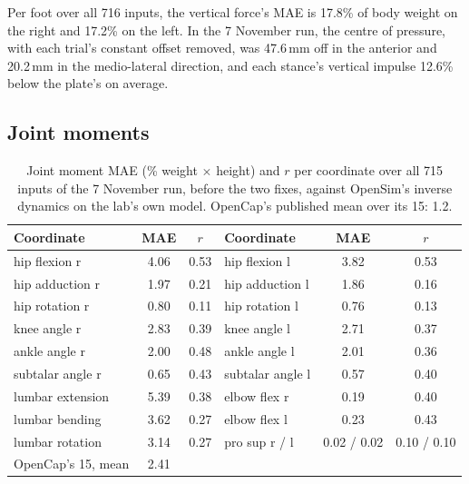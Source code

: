\documentclass[11pt]{article}
\begin{document}
Per foot over all 716 inputs, the vertical force's MAE is 17.8\% of body weight on the right and 17.2\% on the left.
In the 7 November run, the centre of pressure, with each trial's constant offset removed, was 47.6\,mm off in the
anterior and 20.2\,mm in the medio-lateral direction, and each stance's vertical impulse 12.6\% below the plate's on
average.

\subsection{Joint moments}
\begin{table}[h]
\centering\small
\caption{Joint moment MAE (\% weight $\times$ height) and $r$ per coordinate over all 715 inputs of the 7 November
run, before the two fixes, against OpenSim's inverse dynamics on the lab's own model. OpenCap's published mean over
its 15: 1.2.}
\begin{tabular}{@{}lcc@{\hspace{2em}}lcc@{}}
\toprule
Coordinate & MAE & $r$ & Coordinate & MAE & $r$ \\
\midrule
hip flexion r & 4.06 & 0.53 & hip flexion l & 3.82 & 0.53 \\
hip adduction r & 1.97 & 0.21 & hip adduction l & 1.86 & 0.16 \\
hip rotation r & 0.80 & 0.11 & hip rotation l & 0.76 & 0.13 \\
knee angle r & 2.83 & 0.39 & knee angle l & 2.71 & 0.37 \\
ankle angle r & 2.00 & 0.48 & ankle angle l & 2.01 & 0.36 \\
subtalar angle r & 0.65 & 0.43 & subtalar angle l & 0.57 & 0.40 \\
lumbar extension & 5.39 & 0.38 & elbow flex r & 0.19 & 0.40 \\
lumbar bending & 3.62 & 0.27 & elbow flex l & 0.23 & 0.43 \\
lumbar rotation & 3.14 & 0.27 & pro sup r / l & 0.02 / 0.02 & 0.10 / 0.10 \\
\midrule
OpenCap's 15, mean & 2.41 & & & & \\
\bottomrule
\end{tabular}
\end{table}
\end{document}
